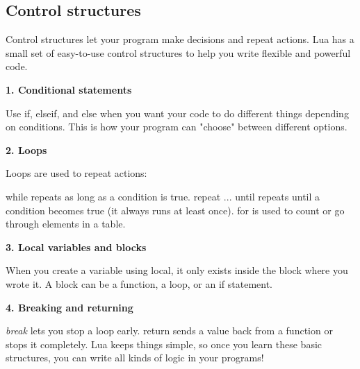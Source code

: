\subsection{Control structures}


Control structures let your program make decisions and repeat actions. Lua has a small set of easy-to-use control structures to help you write flexible and powerful code.

\textbf{1. Conditional statements}

Use if, elseif, and else when you want your code to do different things depending on conditions. This is how your program can "choose" between different options.

\textbf{2. Loops}

Loops are used to repeat actions:

while repeats as long as a condition is true.
repeat ... until repeats until a condition becomes true (it always runs at least once).
for is used to count or go through elements in a table.

\textbf{3. Local variables and blocks}

When you create a variable using local, it only exists inside the block where you wrote it. A block can be a function, a loop, or an if statement.

\textbf{4. Breaking and returning}

\emph{break} lets you stop a loop early.
return sends a value back from a function or stops it completely.
Lua keeps things simple, so once you learn these basic structures, you can write all kinds of logic in your programs!

